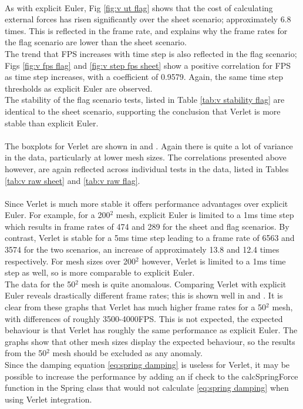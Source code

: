\\As with explicit Euler, Fig \ref{fig:v ut flag} shows that the cost of calculating external forces has risen significantly over the sheet scenario; approximately 6.8 times. This is reflected in the frame rate, and explains why the frame rates for the flag scenario are lower than the sheet scenario.
\\The trend that FPS increases with time step is also reflected in the flag scenario; Figs \ref{fig:v fps flag} and \ref{fig:v step fps sheet} show a positive correlation for FPS as time step increases, with a coefficient of 0.9579. Again, the same time step thresholds as explicit Euler are observed.
\\The stability of the flag scenario tests, listed in Table \ref{tab:v stability flag} are identical to the sheet scenario, supporting the conclusion that Verlet is more stable than explicit Euler.
\\\\The boxplots for Verlet are shown in  and . Again there is quite a lot of variance in the data, particularly at lower mesh sizes. The correlations presented above however, are again reflected across individual tests in the data, listed in Tables \ref{tab:v raw sheet} and \ref{tab:v raw flag}.
\\\\Since Verlet is much more stable it offers performance advantages over explicit Euler. For example, for a 200$^{2}$ mesh, explicit Euler is limited to a 1ms time step which results in frame rates of 474 and 289 for the sheet and flag scenarios. By contrast, Verlet is stable for a 5ms time step leading to a frame rate of 6563 and 3574 for the two scenarios, an increase of approximately 13.8 and 12.4 times respectively. For mesh sizes over 200$^{2}$ however, Verlet is limited to a 1ms time step as well, so is more comparable to explicit Euler.
\\The data for the 50$^{2}$ mesh is quite anomalous. Comparing Verlet with explicit Euler reveals drastically different frame rates; this is shown well in  and . It is clear from these graphs that Verlet has much higher frame rates for a 50$^{2}$ mesh, with differences of roughly 3500-4000FPS. This is not expected, the expected behaviour is that Verlet has roughly the same performance as explicit Euler. The graphs show that other mesh sizes display the expected behaviour, so the results from the 50$^{2}$ mesh should be excluded as any anomaly.
\\Since the damping equation \ref{eq:spring damping} is useless for Verlet, it may be possible to increase the performance by adding an if check to the calcSpringForce function in the Spring class that would not calculate \ref{eq:spring damping} when using Verlet integration.

